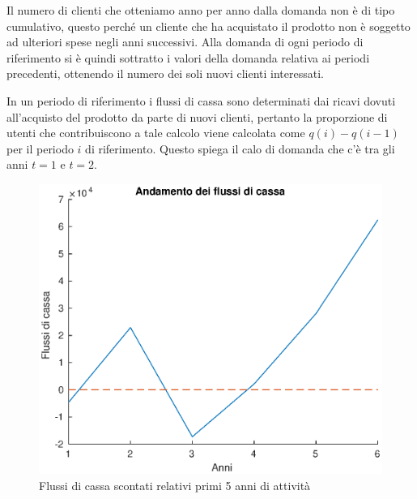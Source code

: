 Il numero di clienti che otteniamo anno per anno dalla domanda non è di tipo
cumulativo, questo perché un cliente che ha acquistato il prodotto non
è soggetto ad ulteriori spese negli anni successivi. Alla domanda di ogni periodo di
riferimento si è quindi sottratto i valori della domanda relativa ai periodi
precedenti, ottenendo il numero dei soli nuovi clienti interessati.

In un periodo di riferimento i flussi di cassa sono determinati dai ricavi
dovuti all’acquisto del prodotto da parte di nuovi clienti, pertanto la
proporzione di utenti che contribuiscono a tale calcolo viene calcolata come
$q(i) - q(i-1)$ per il periodo $i$ di riferimento. Questo spiega il calo di
domanda che c’è tra gli anni $t=1$ e $t=2$.


%
\begin{figure}[!h]
\centering
\includegraphics[width=\textwidth]{figures/cf}
\caption{Flussi di cassa scontati relativi primi 5 anni di attività}
\label{cf}
\end{figure}
%
